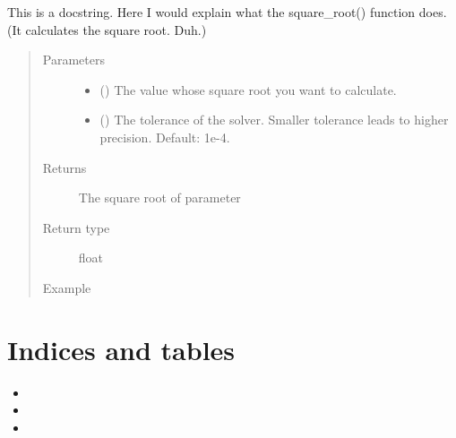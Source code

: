 \documentclass[letterpaper,10pt,english]{sphinxmanual}
\begin{document}

\begin{fulllineitems}
\label{\detokenize{test_functions:test_functions.square_root}}
This is a docstring. Here I would explain what the square\_root() function does. (It calculates the square root. Duh.)
\begin{quote}\begin{description}
\item[{Parameters}] \leavevmode\begin{itemize}
\item {} 
 () \textendash{} The value whose square root you want to calculate.

\item {} 
 () \textendash{} The tolerance of the solver. Smaller tolerance leads to higher precision. Default: 1e-4.

\end{itemize}

\item[{Returns}] \leavevmode
The square root of parameter 

\item[{Return type}] \leavevmode
float

\item[{Example}] \leavevmode
{}%
\begin{sphinxVerbatim}[commandchars=\\\{\}]
  
\end{sphinxVerbatim}

\end{description}\end{quote}

\end{fulllineitems}



\chapter{Indices and tables}
\label{\detokenize{index:indices-and-tables}}\begin{itemize}
\item {} 

\item {} 

\item {} 

\end{itemize}
\end{document}
